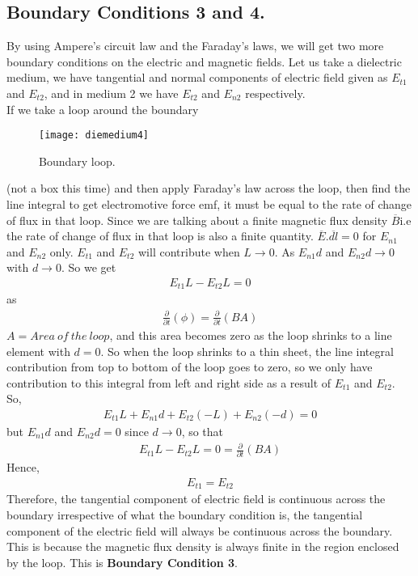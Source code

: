 	\subsection{Boundary Conditions 3 and 4.}
	By using Ampere's circuit law and the Faraday's laws, we will get two more boundary conditions on the electric and magnetic fields. Let us take a dielectric medium, we have tangential and normal components of electric field given as $E_{t1}$ and $E_{t2}$, and in medium 2 we have $E_{t2}$ and $E_{n2}$ respectively.\\
	If we take a loop around the boundary
		\begin{figure}[h]
		\centering
		\texttt{[image: diemedium4]}
		\caption{Boundary loop.}
	\end{figure}
	 (not a box this time) and then apply Faraday's law across the loop, then find the line integral to get electromotive force emf, it must be equal to the rate of change of flux in that loop. Since we are talking about a finite magnetic flux density $\overline{B}$i.e the rate of change of flux in that loop is also a finite quantity. $\overline{E}.\overline{dl} = 0$ for $E_{n1}$ and $E_{n2}$ only. $E_{t1}$ and $E_{t2}$ will contribute when $L \longrightarrow 0$. As $E_{n1}d$ and $E_{n2}d\longrightarrow 0$ with $d \longrightarrow 0$. So we get 
	 \begin{align*}
	 E_{t1}L - E_{t2}L = 0
	 \end{align*}
	  as 
	  \begin{align*}
	  \frac{\partial}{\partial t}(\phi) = \frac{\partial}{\partial t}(BA
	  )
	  \end{align*}
	  $A =  Area\ of\ the\ loop$, and this area becomes zero as the loop shrinks to a line element with $d = 0$. So when the loop shrinks to a thin sheet, the line integral contribution from top to bottom of the loop goes to zero, so we only have contribution to this integral from left and right side as a result of $E_{t1}$ and $E_{t2}$. So, 
	  \begin{align*}
	  E_{t1}L + E_{n1}d +E_{t2}(-L) + E_{n2}(-d) = 0
	  \end{align*}
	  but $E_{n1}d$ and $E_{n2}d = 0$ since $d \longrightarrow 0$, so that 
	  \begin{align*}
	  E_{t1}L - E_{t2}L = 0 = \frac{\partial}{\partial t}(BA)
	  \end{align*}
	  Hence,
	  \begin{align*}
	   E_{t1} = E_{t2}
	  \end{align*}
	  Therefore, the tangential component of electric field is continuous across the boundary irrespective of what the boundary condition is, the tangential component of the electric field will always be continuous across the boundary. This is because the magnetic flux density is always finite in the region enclosed by the loop. This is \textbf{Boundary Condition 3}. \\ \\
